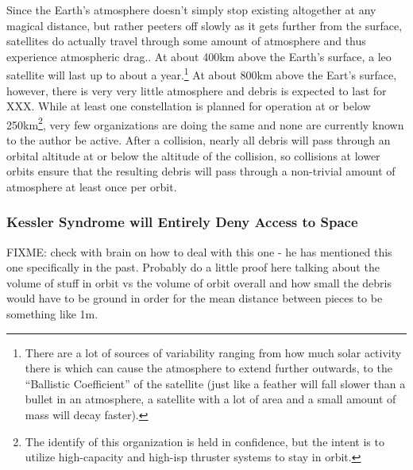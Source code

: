 Since the Earth's atmosphere doesn't simply stop existing altogether
at any magical distance, but rather peeters off slowly as it gets
further from the surface, satellites do actually travel through some
amount of atmosphere and thus experience atmospheric drag.\cite[good
  survey of orbit decay]{xxx}.  At about 400km above the Earth's
surface, a \ac{leo} satellite will last up to about a
year.\footnote{There are a lot of sources of variability ranging from
how much solar activity there is which can cause the atmosphere to
extend further outwards, to the ``Ballistic Coefficient'' of the
satellite (just like a feather will fall slower than a bullet in an
atmosphere, a satellite with a lot of area and a small amount of mass
will decay faster).}\cite[probagbly same survey]{xxx} At about 800km
above the Eart's surface, however, there is very very little
atmosphere and debris is expected to last for XXX.\cite[analysis of
  fengyun using the dread model]{xxx} While at least one constellation
is planned for operation at or below 250km\footnote{The identify of
this organization is held in confidence, but the intent is to utilize
high-capacity and high-isp thruster systems to stay in orbit.}, very
few organizations are doing the same and none are currently known to
the author be active.  After a collision, nearly all debris will pass
through an orbital altitude at or below the altitude of the collision,
so collisions at lower orbits ensure that the resulting debris will
pass through a non-trivial amount of atmosphere at least once per
orbit.

\subsubsection{Kessler Syndrome will Entirely Deny Access to Space}
FIXME: check with brain on how to deal with this one - he has
mentioned this one specifically in the past.  Probably do a little
proof here talking about the volume of stuff in orbit vs the volume of
orbit overall and how small the debris would have to be ground in
order for the mean distance between pieces to be something like 1m.

